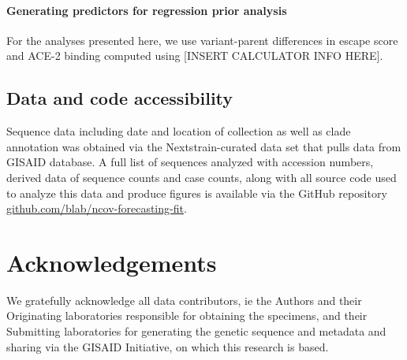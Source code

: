\documentclass[12pt,oneside,letterpaper]{article}
\begin{document}
\paragraph{Generating predictors for regression prior analysis}%

For the analyses presented here, we use variant-parent differences in escape score and ACE-2 binding computed using [INSERT CALCULATOR INFO HERE].

\subsection*{Data and code accessibility}

Sequence data including date and location of collection as well as clade annotation was obtained via the Nextstrain-curated data set that pulls data from GISAID database.
A full list of sequences analyzed with accession numbers, derived data of sequence counts and case counts, along with all source code used to analyze this data and produce figures is available via the GitHub repository \href{https://github.com/blab/ncov-forecasting-fit}{github.com/blab/ncov-forecasting-fit}.

\section*{Acknowledgements}

We gratefully acknowledge all data contributors, ie the Authors and their Originating laboratories responsible for obtaining the specimens, and their Submitting laboratories for generating the genetic sequence and metadata and sharing via the GISAID Initiative, on which this research is based.



\end{document}
